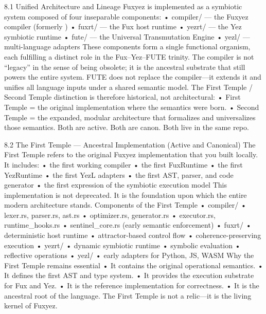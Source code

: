 8.1 Unified Architecture and Lineage
Fuxyez is implemented as a symbiotic system composed of four inseparable components:
• 	compiler/ — the Fuxyez compiler (formerly )
• 	fuxrt/ — the Fux host runtime
• 	yezrt/ — the Yez symbiotic runtime
• 	fute/ — the Universal Transmutation Engine
• 	yezl/ — multi-language adapters
These components form a single functional organism, each fulfilling a distinct role in the Fux–Yez–FUTE trinity. The compiler is not “legacy” in the sense of being obsolete; it is the ancestral substrate that still powers the entire system. FUTE does not replace the compiler—it extends it and unifies all language inputs under a shared semantic model.
The First Temple / Second Temple distinction is therefore historical, not architectural:
• 	First Temple = the original implementation where the semantics were born.
• 	Second Temple = the expanded, modular architecture that formalizes and universalizes those semantics.
Both are active. Both are canon. Both live in the same repo.

8.2 The First Temple — Ancestral Implementation (Active and Canonical)
The First Temple refers to the original Fuxyez implementation that you built locally. It includes:
• 	the first working compiler
• 	the first FuxRuntime
• 	the first YezRuntime
• 	the first YezL adapters
• 	the first AST, parser, and code generator
• 	the first expression of the symbiotic execution model
This implementation is not deprecated. It is the foundation upon which the entire modern architecture stands.
Components of the First Temple
• 	compiler/
• 	lexer.rs, parser.rs, ast.rs
• 	optimizer.rs, generator.rs
• 	executor.rs, runtime_hooks.rs
• 	sentinel_core.rs (early semantic enforcement)
• 	fuxrt/
• 	deterministic host runtime
• 	attractor-based control flow
• 	coherence-preserving execution
• 	yezrt/
• 	dynamic symbiotic runtime
• 	symbolic evaluation
• 	reflective operations
• 	yezl/
• 	early adapters for Python, JS, WASM
Why the First Temple remains essential
• 	It contains the original operational semantics.
• 	It defines the first AST and type system.
• 	It provides the execution substrate for Fux and Yez.
• 	It is the reference implementation for correctness.
• 	It is the ancestral root of the language.
The First Temple is not a relic—it is the living kernel of Fuxyez.

